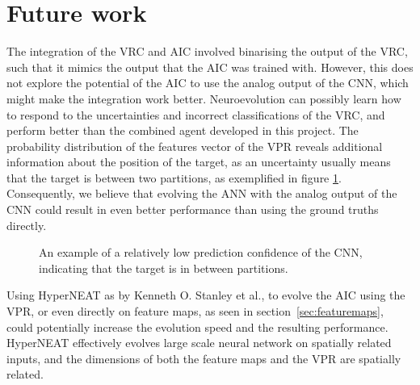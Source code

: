 
\newpage
\section{Future work}
\label{sec:futurework}
The integration of the VRC and AIC involved binarising the output of the VRC, such that it mimics the output that the AIC was trained with. However, this does not explore the potential of the AIC to use the analog output of the CNN, which might make the integration work better. Neuroevolution can possibly learn how to respond to the uncertainties and incorrect classifications of the VRC, and perform better than the combined agent developed in this project. The probability distribution of the features vector of the VPR reveals additional information about the position of the target, as an uncertainty usually means that the target is between two partitions, as exemplified in figure \ref{fig:uncertain}. Consequently, we believe that evolving the ANN with the analog output of the CNN could result in even better performance than using the ground truths directly.

\begin{figure}[H]
	\centering
	\begin{scriptsize}
		\sffamily
		
	\end{scriptsize}
	\caption[An example of uncertain classification]{An example of a relatively low prediction confidence of the CNN, indicating that the target is in between partitions.}
	\label{fig:uncertain}
\end{figure}
\noindent
Using HyperNEAT as by Kenneth O. Stanley et al.\cite{DBLP:journals/alife/StanleyDG09}, to evolve the AIC using the VPR, or even directly on feature maps, as seen in section~\ref{sec:featuremaps}, could potentially increase the evolution speed and the resulting performance. HyperNEAT effectively evolves large scale neural network on spatially related inputs, and the dimensions of both the feature maps and the VPR are spatially related.